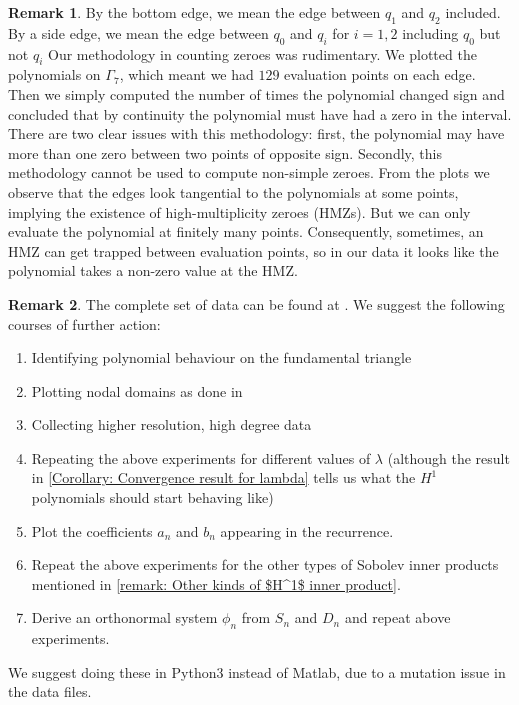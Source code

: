 \documentclass[12pt]{amsart}
\theoremstyle{plain}
\theoremstyle{definition}
\newtheorem{remark}{Remark}[section]
\begin{document}
\begin{remark}\label{remark:methodology in zeroes}
By the bottom edge, we mean the edge between $q_1$ and $q_2$ included. By a side edge, we mean the edge between $q_0$ and $q_i$ for $i=1,2$ including $q_0$ but not $q_i$ Our methodology in counting zeroes was rudimentary. We plotted the polynomials on $\Gamma_7$, which meant we had $129$ evaluation points on each edge. Then we simply computed the number of times the polynomial changed sign and concluded that by continuity the polynomial must have had a zero in the interval. There are two clear issues with this methodology: first, the polynomial may have more than one zero between two points of opposite sign. Secondly, this methodology cannot be used to compute non-simple zeroes. From the plots we observe that the edges look tangential to the polynomials at some points, implying the existence of high-multiplicity zeroes (HMZs). But we can only evaluate the polynomial at finitely many points. Consequently, sometimes, an HMZ can get trapped between evaluation points, so in our data it looks like the polynomial takes a non-zero value at the HMZ. 
\end{remark}

\begin{remark}\label{remark: Further challenges}
The complete set of data can be found at \cite{[JSV]}. We suggest the following courses of further action:

\begin{enumerate}
    \item Identifying polynomial behaviour on the fundamental triangle
    \item Plotting nodal domains as done in \cite{OST}
    \item Collecting higher resolution, high degree data
    \item Repeating the above experiments for different values of $\lambda$ (although the result in \ref{Corollary: Convergence result for lambda} tells us what the $H^1$ polynomials should start behaving like)
    \item Plot the coefficients $a_n$ and $b_n$ appearing in the recurrence.
    \item Repeat the above experiments for the other types of Sobolev inner products mentioned in \ref{remark: Other kinds of $H^1$ inner product}. 
    \item Derive an orthonormal system $\phi_n$ from $S_n$ and $D_n$ and repeat above experiments. 
\end{enumerate}

We suggest doing these in Python3 instead of Matlab, due to a mutation issue in the data files.
\end{remark}
\end{document}
